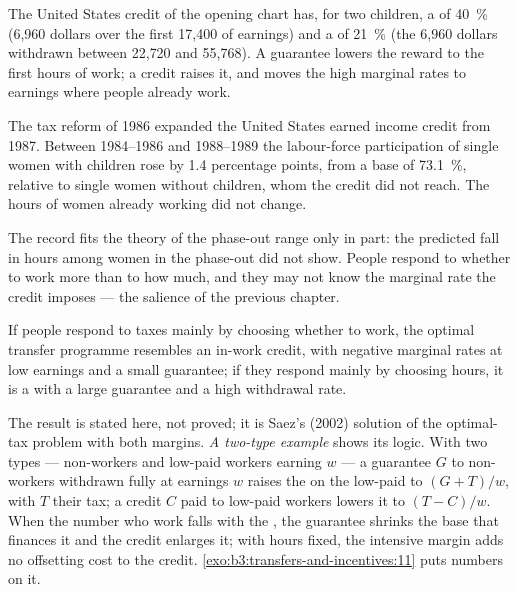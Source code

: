 The United States credit of the opening chart has, for two children, a 
of 40~\% (6{,}960 dollars over the first 17{,}400 of earnings) and a  of
21~\% (the 6{,}960 dollars withdrawn between 22{,}720 and 55{,}768). %
A guarantee lowers the reward to the first hours of work; a credit raises it, and
moves the high marginal rates to earnings where people already work.

\begin{record}
The tax reform of 1986 expanded the United States earned income credit from 1987.
Between 1984--1986 and 1988--1989 the labour-force participation of single women with
children rose by 1.4 percentage points, from a base of 73.1~\%, relative to single
women without children, whom the credit did not reach. The hours of women already
working did not change. %
\end{record}

The record fits the theory of the phase-out range only in part: the predicted fall in
hours among women in the phase-out did not show. People respond to whether to work
more than to how much, and they may not know the marginal rate the credit imposes
--- the salience of the previous chapter.

\begin{proposition}\label{prop:b3:transfers-and-incentives:participation}
If people respond to taxes mainly by choosing whether to work, the optimal transfer
programme resembles an in-work credit, with negative marginal rates at low earnings
and a small guarantee; if they respond mainly by choosing hours, it is a  with a large guarantee and a high withdrawal rate.
\end{proposition}

\noindent The result is stated here, not proved; it is Saez's (2002) solution of the
optimal-tax problem with both margins. %
\emph{A two-type example} shows its logic. With two types --- non-workers and low-paid workers earning $w$ --- a guarantee $G$ to
non-workers withdrawn fully at earnings $w$ raises the  on the
low-paid to $(G + T)/w$, with $T$ their tax; a credit $C$ paid to low-paid workers lowers it to
$(T - C)/w$. When the number who work falls with the , the guarantee
shrinks the base that finances it and the credit enlarges it; with hours fixed, the
intensive margin adds no offsetting cost to the credit.
\cref{exo:b3:transfers-and-incentives:11} puts numbers on it.

